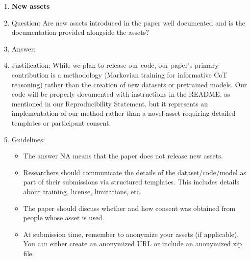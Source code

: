 \documentclass{article}
\begin{document}
\begin{enumerate}
\item {\bf New assets}
    \item[] Question: Are new assets introduced in the paper well documented and is the documentation provided alongside the assets?
    \item[] Answer: \answerNA{} %
    \item[] Justification: While we plan to release our code, our paper's primary contribution is a methodology (Markovian training for informative CoT reasoning) rather than the creation of new datasets or pretrained models. Our code will be properly documented with instructions in the README, as mentioned in our Reproducibility Statement, but it represents an implementation of our method rather than a novel asset requiring detailed templates or participant consent.
    \item[] Guidelines:
    \begin{itemize}
        \item The answer NA means that the paper does not release new assets.
        \item Researchers should communicate the details of the dataset/code/model as part of their submissions via structured templates. This includes details about training, license, limitations, etc. 
        \item The paper should discuss whether and how consent was obtained from people whose asset is used.
        \item At submission time, remember to anonymize your assets (if applicable). You can either create an anonymized URL or include an anonymized zip file.
    \end{itemize}


\end{enumerate}
\end{document}
